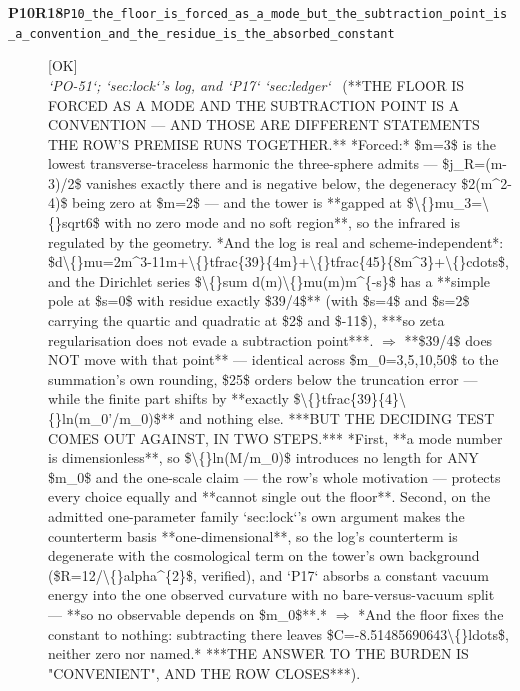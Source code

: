 \begin{description}
\item[\textbf{P10R18}\quad\texttt{P10\_the\_floor\_is\_forced\_as\_a\_mode\_but\_the\_subtraction\_point\_is\_a\_convention\_and\_the\_residue\_is\_the\_absorbed\_constant}]\hfill\textsf{[OK]}\\
\textit{`PO-51`; `sec:lock`'s log, and `P17` `sec:ledger`} \ (**THE FLOOR IS FORCED AS A MODE AND THE SUBTRACTION POINT IS A CONVENTION --- AND THOSE ARE DIFFERENT STATEMENTS THE ROW'S PREMISE RUNS TOGETHER.**  *Forced:* \$m=3\$ is the lowest transverse-traceless harmonic the three-sphere admits --- \$j\_R=(m-3)/2\$ vanishes exactly there and is negative below, the degeneracy \$2(m\textasciicircum{}2-4)\$ being zero at \$m=2\$ --- and the tower is **gapped at \$\textbackslash\{\}mu\_3=\textbackslash\{\}sqrt6\$ with no zero mode and no soft region**, so the infrared is regulated by the geometry.  *And the log is real and scheme-independent*: \$d\textbackslash\{\}mu=2m\textasciicircum{}3-11m+\textbackslash\{\}tfrac\{39\}\{4m\}+\textbackslash\{\}tfrac\{45\}\{8m\textasciicircum{}3\}+\textbackslash\{\}cdots\$, and the Dirichlet series \$\textbackslash\{\}sum d(m)\textbackslash\{\}mu(m)m\textasciicircum{}\{-s\}\$ has a **simple pole at \$s=0\$ with residue exactly \$39/4\$** (with \$s=4\$ and \$s=2\$ carrying the quartic and quadratic at \$2\$ and \$-11\$), ***so zeta regularisation does not evade a subtraction point***. \ensuremath{\Rightarrow} **\$39/4\$ does NOT move with that point** --- identical across \$m\_0=3,5,10,50\$ to the summation's own rounding, \$25\$ orders below the truncation error --- while the finite part shifts by **exactly \$\textbackslash\{\}tfrac\{39\}\{4\}\textbackslash\{\}ln(m\_0'/m\_0)\$** and nothing else.  ***BUT THE DECIDING TEST COMES OUT AGAINST, IN TWO STEPS.*** *First, **a mode number is dimensionless**, so \$\textbackslash\{\}ln(M/m\_0)\$ introduces no length for ANY \$m\_0\$ and the one-scale claim --- the row's whole motivation --- protects every choice equally and **cannot single out the floor**. Second, on the admitted one-parameter family `sec:lock`'s own argument makes the counterterm basis **one-dimensional**, so the log's counterterm is degenerate with the cosmological term on the tower's own background (\$R=12/\textbackslash\{\}alpha\textasciicircum{}\{2\}\$, verified), and `P17` absorbs a constant vacuum energy into the one observed curvature with no bare-versus-vacuum split --- **so no observable depends on \$m\_0\$**.* \ensuremath{\Rightarrow} *And the floor fixes the constant to nothing: subtracting there leaves \$C=-8.51485690643\textbackslash\{\}ldots\$, neither zero nor named.* ***THE ANSWER TO THE BURDEN IS "CONVENIENT", AND THE ROW CLOSES***). 

\end{description}
